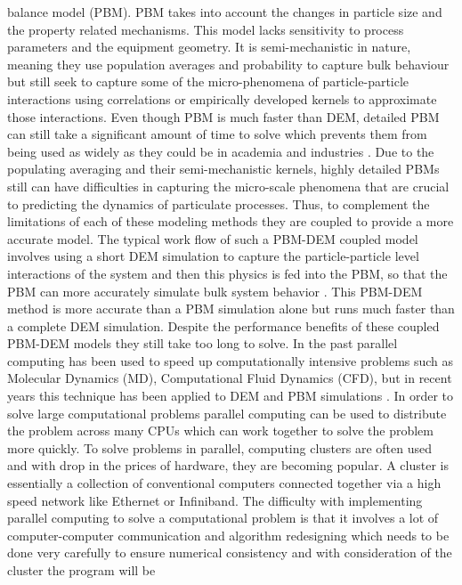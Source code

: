 \documentclass[preprint,11pt,authoryear]{elsarticle}
\begin{document}
balance model (PBM).
 PBM takes into account the changes in particle size and the property related mechanisms. This 
model lacks sensitivity to process parameters and the equipment geometry. It is semi-mechanistic in 
nature, meaning they use population averages and probability to capture bulk behaviour but still 
seek to capture some of the micro-phenomena of particle-particle interactions using correlations or 
empirically developed kernels to approximate those interactions. Even though PBM is much faster 
than DEM, detailed PBM can still take a significant amount of time to solve which prevents them 
from being used as widely as they could be in academia and industries \citep{Barrasso2013}. Due to the 
populating averaging and their semi-mechanistic kernels, highly detailed PBMs still can have 
difficulties in capturing the micro-scale phenomena that are crucial to predicting the dynamics of 
particulate processes. 
 Thus, to complement the limitations of each of these modeling methods they are coupled to 
provide a more accurate model.  The typical work flow of such a PBM-DEM coupled model involves 
using a short DEM simulation to capture the particle-particle level interactions of the system and 
then this physics is fed into the PBM, so that the PBM can more accurately simulate bulk system 
behavior \citep{Goldschmidt2003} \citep{Reinhold2012}\citep{Barrasso2013}. This PBM-DEM 
method is more accurate than a PBM simulation alone but runs much faster than a complete DEM 
simulation. Despite the performance benefits of these coupled PBM-DEM models they still take too 
long to solve. In the past parallel computing has been used to speed up computationally intensive 
problems such as Molecular Dynamics (MD), Computational Fluid Dynamics (CFD), but in recent 
years  this technique has been applied to DEM and PBM simulations 
\citep{Bettencourt2017}\citep{Prakash2013a}\citep{Gunawan2008}.
 In order to solve large computational problems parallel computing can be used to distribute the 
problem across many CPUs which can work together to solve the problem more quickly. To solve 
problems in parallel, computing clusters are often used and with drop  in the prices of hardware, 
they are becoming popular. A cluster is essentially a collection of conventional computers 
connected together via a high speed network like Ethernet or Infiniband. The difficulty with 
implementing parallel computing to solve a computational problem is that it involves a lot of 
computer-computer communication and algorithm redesigning which needs to be done very 
carefully to ensure numerical consistency and with consideration of the cluster the program will be 
\end{document}
